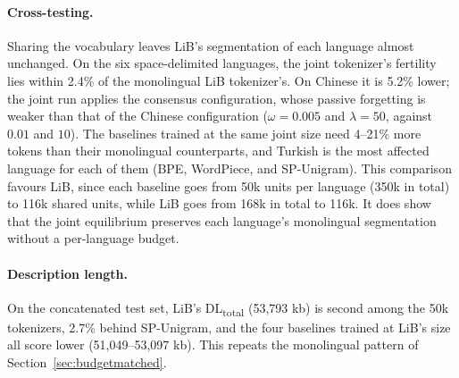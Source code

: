\documentclass[pdflatex,sn-apa]{sn-jnl}
\begin{document}
\paragraph{Cross-testing.}
Sharing the vocabulary leaves LiB's segmentation of each language almost
unchanged. On the six space-delimited languages, the joint tokenizer's
fertility lies within 2.4\% of the monolingual LiB tokenizer's. On Chinese it
is 5.2\% lower; the joint run applies the consensus configuration, whose
passive forgetting is weaker than that of the Chinese configuration
($\omega{=}0.005$ and $\lambda{=}50$, against $0.01$ and $10$). The baselines
trained at the same joint size need 4--21\% more tokens than their
monolingual counterparts, and Turkish is the most affected language for
each of them (BPE, WordPiece, and SP-Unigram). This comparison favours LiB,
since each baseline goes from 50k units per language (350k in total) to 116k
shared units, while LiB goes from 168k in total to 116k. It does show that
the joint equilibrium preserves each language's monolingual segmentation
without a per-language budget.

\paragraph{Description length.}
On the concatenated test set, LiB's DL\textsubscript{total} (53,793 kb) is
second among the 50k tokenizers, 2.7\% behind SP-Unigram, and the four
baselines trained at LiB's size all score lower (51,049--53,097 kb). This
repeats the monolingual pattern of Section~\ref{sec:budgetmatched}.
\end{document}
